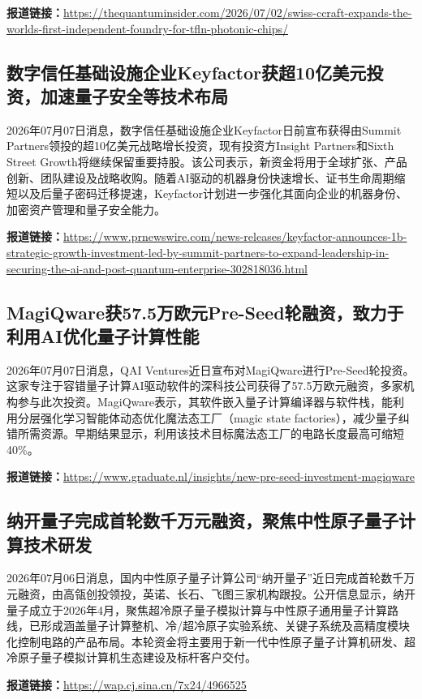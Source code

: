 \documentclass[12pt,a4paper]{ctexart}
\begin{document}
\noindent\textbf{报道链接：}\url{https://thequantuminsider.com/2026/07/02/swiss-ccraft-expands-the-worlds-first-independent-foundry-for-tfln-photonic-chips/}

\subsection{ 数字信任基础设施企业Keyfactor获超10亿美元投资，加速量子安全等技术布局 }

2026年07月07日消息，数字信任基础设施企业Keyfactor日前宣布获得由Summit Partners领投的超10亿美元战略增长投资，现有投资方Insight Partners和Sixth Street Growth将继续保留重要持股。该公司表示，新资金将用于全球扩张、产品创新、团队建设及战略收购。随着AI驱动的机器身份快速增长、证书生命周期缩短以及后量子密码迁移提速，Keyfactor计划进一步强化其面向企业的机器身份、加密资产管理和量子安全能力。

\noindent\textbf{报道链接：}\url{https://www.prnewswire.com/news-releases/keyfactor-announces-1b-strategic-growth-investment-led-by-summit-partners-to-expand-leadership-in-securing-the-ai-and-post-quantum-enterprise-302818036.html}

\subsection{ MagiQware获57.5万欧元Pre-Seed轮融资，致力于利用AI优化量子计算性能 }

2026年07月07日消息，QAI Ventures近日宣布对MagiQware进行Pre-Seed轮投资。这家专注于容错量子计算AI驱动软件的深科技公司获得了57.5万欧元融资，多家机构参与此次投资。MagiQware表示，其软件嵌入量子计算编译器与软件栈，能利用分层强化学习智能体动态优化魔法态工厂（magic state factories），减少量子纠错所需资源。早期结果显示，利用该技术目标魔法态工厂的电路长度最高可缩短40\%。

\noindent\textbf{报道链接：}\url{https://www.graduate.nl/insights/new-pre-seed-investment-magiqware}

\subsection{ 纳开量子完成首轮数千万元融资，聚焦中性原子量子计算技术研发 }

2026年07月06日消息，国内中性原子量子计算公司“纳开量子”近日完成首轮数千万元融资，由高瓴创投领投，英诺、长石、飞图三家机构跟投。公开信息显示，纳开量子成立于2026年4月，聚焦超冷原子量子模拟计算与中性原子通用量子计算路线，已形成涵盖量子计算整机、冷/超冷原子实验系统、关键子系统及高精度模块化控制电路的产品布局。本轮资金将主要用于新一代中性原子量子计算机研发、超冷原子量子模拟计算机生态建设及标杆客户交付。

\noindent\textbf{报道链接：}\url{https://wap.cj.sina.cn/7x24/4966525}
\end{document}
